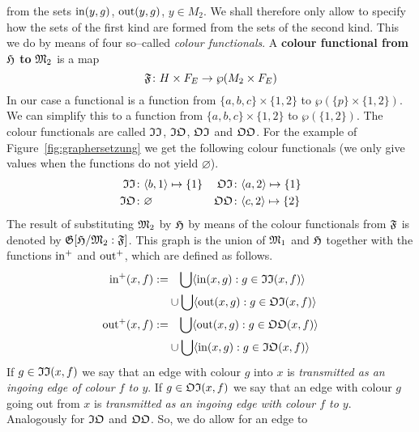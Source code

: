 from the sets $\operatorname{in}(y,g)$, $\operatorname{out}(y,g)$, $y \in M_2$. We shall 
therefore only allow to specify how the sets of the first kind are 
formed from the sets of the second kind. This we do by means of
four so--called {\it colour functionals}. A \textbf{colour functional 
from} $\mathfrak{H}$ \textbf{to} $\mathfrak{M}_2$ is a map
\begin{equation}
\mathfrak{F} \colon H \times F_E \rightarrow \wp(M_2 \times F_E)
\end{equation}
In our case a functional is a function
from $\{a,b,c\} \times \{1,2\}$ to $\wp(\{p\} \times \{1,2\})$.
We can simplify this to a function from $\{a,b,c\} \times \{1,2\}$
to $\wp(\{1,2\})$. The colour functionals are called $\mathfrak{II}$,
$\mathfrak{IO}$, $\mathfrak{OI}$ and $\mathfrak{OO}$. 
For the example of Figure~\ref{fig:graphersetzung} we get the 
following colour functionals (we only give values when the 
functions do not yield $\varnothing$).
\begin{align}
\mathfrak{II} & \colon \langle b, 1\rangle \mapsto \{1\} &
\mathfrak{OI} & \colon \langle a, 2\rangle \mapsto \{1\} \\\notag
\mathfrak{IO} & \colon \varnothing &
\mathfrak{OO} & \colon \langle c, 2\rangle \mapsto \{2\}
\end{align}
The result of substituting $\mathfrak{M}_2$ by $\mathfrak{H}$ by means of the
colour functionals from $\mathfrak{F}$ is denoted by $\mathfrak{G}[\mathfrak{H}/\mathfrak{M}_2 : \mathfrak{F}]$.
\index{$\GG[\GH/\GM : \GF]$}%
This graph is the union of $\mathfrak{M}_1$ and $\mathfrak{H}$ together with the
functions $\operatorname{in}^+$ and $\operatorname{out}^+$, which are defined as follows.
\begin{equation}
\begin{split}
\operatorname{in}^+(x,f) := & \phantom{\cup}\, \bigcup \langle \operatorname{in}(x,g) :
    g \in \mathfrak{II}(x,f)\rangle \\
    & \cup \bigcup \langle \operatorname{out}(x,g) :
    g \in \mathfrak{OI}(x,f) \rangle \\
\operatorname{out}^+(x,f) := & \phantom{\cup}\, \bigcup \langle \operatorname{out}(x,g) :
    g \in \mathfrak{OO}(x,f)\rangle \\
    & \cup \bigcup \langle \operatorname{in}(x,g) :
    g \in \mathfrak{IO}(x,f) \rangle
\end{split}
\end{equation}
If $g \in \mathfrak{II}(x,f)$ we say that an edge with
colour $g$ into $x$ is {\it transmitted as an ingoing edge of
colour $f$ to $y$}. If $g \in \mathfrak{OI}(x,f)$ we say
that an edge with colour $g$ going out from $x$ is {\it transmitted
as an ingoing edge with colour $f$ to $y$}. Analogously for
$\mathfrak{IO}$ and $\mathfrak{OO}$. So, we do allow for an edge to
